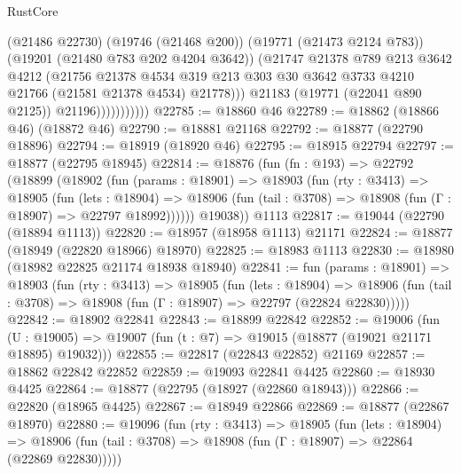 \begin{lexlean}{RustCore}
\begin{coremodule}
                            (@21486 @22730)
                            (@19746 (@21468 @200))
                            (@19771 (@21473 @2124 @783))
                            (@19201 (@21480 @783 @202 @4204 @3642))
                            (@21747
                              @21378
                              @789
                              @213
                              @3642
                              @4212
                              (@21756
                                @21378
                                @4534
                                @319
                                @213
                                @303
                                @30
                                @3642
                                @3733
                                @4210
                                @21766
                                (@21581 @21378 @4534)
                                @21778)))
                          @21183
                          (@19771 (@22041 @890 @2125))
                          @21196)))))))))))
@22785 := @18860 @46
@22789 := @18862 (@18866 @46) (@18872 @46)
@22790 := @18881 @21168
@22792 := @18877 (@22790 @18896)
@22794 := @18919 (@18920 @46)
@22795 := @18915 @22794
@22797 := @18877 (@22795 @18945)
@22814 := @18876
    (fun (fn : @193) =>
    @22792
      (@18899
        (@18902
          (fun (params : @18901) =>
          @18903
            (fun (rty : @3413) =>
            @18905
              (fun (lets : @18904) =>
              @18906 (fun (tail : @3708) => @18908 (fun (Γ : @18907) => @22797 @18992))))))
        @19038))
    @1113
@22817 := @19044 (@22790 (@18894 @1113))
@22820 := @18957 (@18958 @1113) @21171
@22824 := @18877 (@18949 (@22820 @18966) @18970)
@22825 := @18983 @1113
@22830 := @18980 (@18982 @22825 @21174 @18938 @18940)
@22841 := fun (params : @18901) =>
  @18903
    (fun (rty : @3413) =>
    @18905
      (fun (lets : @18904) =>
      @18906 (fun (tail : @3708) => @18908 (fun (Γ : @18907) => @22797 (@22824 @22830)))))
@22842 := @18902 @22841
@22843 := @18899 @22842
@22852 := @19006
    (fun (U : @19005) => @19007 (fun (t : @7) => @19015 (@18877 (@19021 @21171 @18895) @19032)))
@22855 := @22817 (@22843 @22852) @21169
@22857 := @18862 @22842 @22852
@22859 := @19093 @22841 @4425
@22860 := @18930 @4425
@22864 := @18877 (@22795 (@18927 (@22860 @18943)))
@22866 := @22820 (@18965 @4425)
@22867 := @18949 @22866
@22869 := @18877 (@22867 @18970)
@22880 := @19096
    (fun (rty : @3413) =>
    @18905
      (fun (lets : @18904) =>
      @18906 (fun (tail : @3708) => @18908 (fun (Γ : @18907) => @22864 (@22869 @22830)))))

\end{coremodule}
\end{lexlean}
